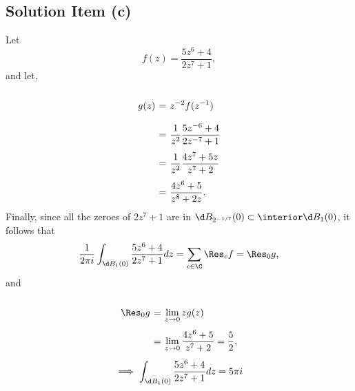 \subsection*{Solution Item (c)}

Let
\[ f(z) = \frac{5z^6 + 4}{2z^7 + 1}, \]
and let,
\[ \everymath{\displaystyle}
\arraycolsep=1.8pt\def\arraystretch{2.5}
\begin{array}{rcl}
    g(z) & = & z^{-2} f(z^{-1})\\
    & = & \frac{1}{z^2} \frac{5z^{-6} + 4}{2z^{-7} + 1}\\
    & = & \frac{1}{z^2} \frac{4 z^{7} + 5z}{z^7 + 2}\\
    & = & \frac{4 z^{6} + 5}{z^8 + 2z}.
\end{array} \]
Finally, since all the zeroes of $2z^7 + 1$ are in $\d B_{2^{-1/7}}(0) \subset \interior \d B_{1}(0)$, it follows that
\[ \frac{1}{2\pi i} \int_{\d B_1(0)} \frac{5z^6 + 4}{2z^7 + 1} dz = \sum_{c\in \C} \Res_c f = \Res_0 g ,\]
and
\[ \everymath{\displaystyle}
\arraycolsep=1.8pt\def\arraystretch{2.5}
\begin{array}{rcl}
    \Res_0 g & = & \lim_{z\to 0} z g(z)\\
    & = & \lim_{z\to 0} \frac{4 z^{6} + 5}{z^7 + 2} = \frac{5}{2},
\end{array} \]
\[ \implies  \int_{\d B_1(0)} \frac{5z^6 + 4}{2z^7 + 1} dz = 5\pi i\]